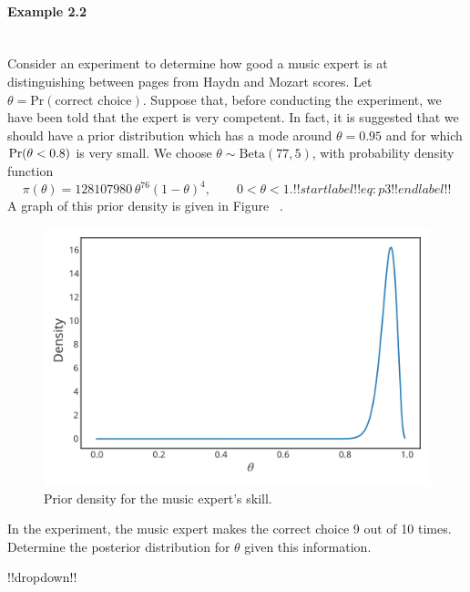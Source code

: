 \paragraph{Example 2.2}{~\\
Consider an experiment to determine how good a music expert is at  distinguishing between pages from Haydn and Mozart scores. Let $\theta=\text{Pr}(\text{correct choice})$. Suppose that, before conducting the experiment, we have been told that the expert is very competent. In fact, it is suggested that we should have a prior distribution which has a mode around $\theta=0.95$ and for which $\textnormal{Pr}(\theta<0.8)$ is very small. We choose $\theta\sim \mathrm{Beta}(77,5)$, with probability density function
\begin{equation}
\pi(\theta)=128107980\,\theta^{76}(1-\theta)^4,\quad\quad 0<\theta<1.
!!startlabel!! eq:p3 !!endlabel!!
\end{equation}
A graph of this prior density is given in Figure ~.
\begin{figure}[ht]

\includegraphics{images/priorplot2.svg}
\caption{Prior density for the music expert's skill.}


\end{figure}

In the experiment, the music expert makes the correct choice 9 out of 10 times. Determine the posterior distribution for $\theta$ given this information.






!!dropdown!!

}
